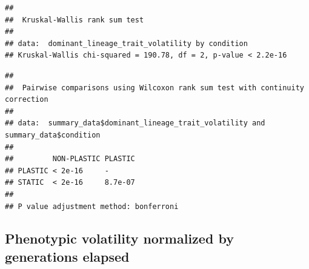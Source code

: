 \documentclass[]{book}
\newenvironment{Shaded}{\begin{snugshade}}{\end{snugshade}}
\newcommand{\DataTypeTok}[1]{\textcolor[rgb]{0.13,0.29,0.53}{#1}}
\newcommand{\KeywordTok}[1]{\textcolor[rgb]{0.13,0.29,0.53}{\textbf{#1}}}
\newcommand{\NormalTok}[1]{#1}
\newcommand{\OperatorTok}[1]{\textcolor[rgb]{0.81,0.36,0.00}{\textbf{#1}}}
\newcommand{\StringTok}[1]{\textcolor[rgb]{0.31,0.60,0.02}{#1}}
\begin{document}
\begin{verbatim}
## 
##  Kruskal-Wallis rank sum test
## 
## data:  dominant_lineage_trait_volatility by condition
## Kruskal-Wallis chi-squared = 190.78, df = 2, p-value < 2.2e-16
\end{verbatim}

\begin{Shaded}
\end{Shaded}

\begin{verbatim}
## 
##  Pairwise comparisons using Wilcoxon rank sum test with continuity correction 
## 
## data:  summary_data$dominant_lineage_trait_volatility and summary_data$condition 
## 
##         NON-PLASTIC PLASTIC
## PLASTIC < 2e-16     -      
## STATIC  < 2e-16     8.7e-07
## 
## P value adjustment method: bonferroni
\end{verbatim}

\hypertarget{phenotypic-volatility-normalized-by-generations-elapsed}{%
\subsection{Phenotypic volatility normalized by generations elapsed}\label{phenotypic-volatility-normalized-by-generations-elapsed}}
\end{document}
